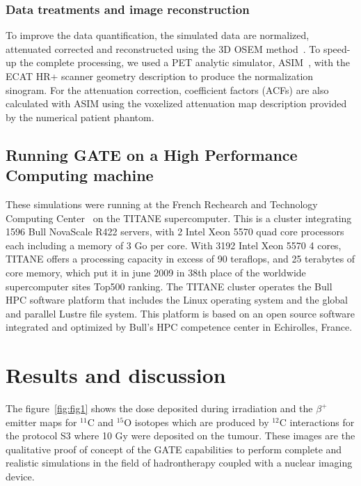 \documentclass[11pt]{iopart}
\begin{document}
\subsubsection{Data treatments and image reconstruction}

To improve the data quantification, the simulated data are normalized, attenuated corrected and reconstructed using the 3D OSEM method~\cite{OSEM ref}. To speed-up the complete processing, we used a PET analytic simulator, ASIM~\cite{Comtat1999}, with the ECAT HR+ scanner geometry description to produce the normalization sinogram. For the attenuation correction, coefficient factors (ACFs) are also calculated with ASIM using the voxelized attenuation map description provided by the numerical patient phantom. 

\subsection{Running GATE on a High Performance Computing machine}

These simulations were running at the French Rechearch and Technology Computing Center~\cite{CCRT} on the TITANE supercomputer. This is a cluster integrating 1596 Bull NovaScale R422 servers, with 2 Intel Xeon 5570 quad core processors each including a memory of 3 Go per core. With 3192 Intel Xeon 5570 4 cores, TITANE offers a processing capacity in excess of 90 teraflops, and 25 terabytes of core memory, which put it in june 2009 in 38th place of the worldwide supercomputer sites Top500 ranking. The TITANE cluster operates the Bull HPC software platform that includes the Linux operating system and the global and parallel Lustre file system. This platform is based on an open source software integrated and optimized by Bull's HPC competence center in Echirolles, France.

\section{Results and discussion}



The figure~\ref{fig:fig1} shows the dose deposited during irradiation and the $\beta^+$ emitter maps for $^{11}$C and $^{15}$O isotopes which are produced by $^{12}$C interactions for the protocol S3 where 10 Gy were deposited on the tumour. These images are the qualitative proof of concept of the GATE capabilities to perform complete and realistic simulations in the field of hadrontherapy coupled with a nuclear imaging device.
\end{document}

